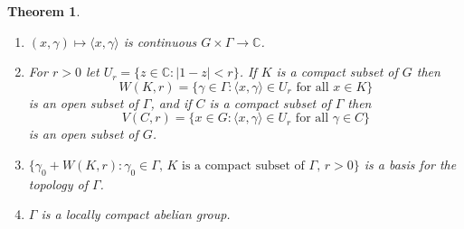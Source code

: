 \documentclass{article}
\newcommand{\inner}[2]{\langle #1, #2 \rangle}
\newtheorem{theorem}{Theorem}
\begin{document}
\begin{theorem}
\begin{enumerate}
\item $(x,\gamma) \mapsto \inner{x}{\gamma}$ is continuous $G \times \Gamma \to \mathbb{C}$.
\item For $r>0$ let $U_r = \{z \in \mathbb{C}: |1-z|<r\}$. If $K$ is a compact subset of $G$ then
\[
W(K,r) = \{\gamma \in \Gamma: \textrm{$\inner{x}{\gamma} \in U_r$ for all $x \in K$}\}
\]
is an open subset of $\Gamma$, and if $C$ is a compact subset of $\Gamma$ then
\[
V(C,r) = \{x \in G: \textrm{$\inner{x}{\gamma} \in U_r$ for all $\gamma \in C$}\}
\]
is an open subset of $G$.
\item $\{\gamma_0+W(K,r): \textrm{$\gamma_0 \in \Gamma$, $K$ is a compact subset of $\Gamma$, $r>0$}\}$ is a basis for the topology of $\Gamma$.
\item $\Gamma$ is a locally compact abelian group.
\end{enumerate}
\label{topologybasis}
\end{theorem}
\end{document}
